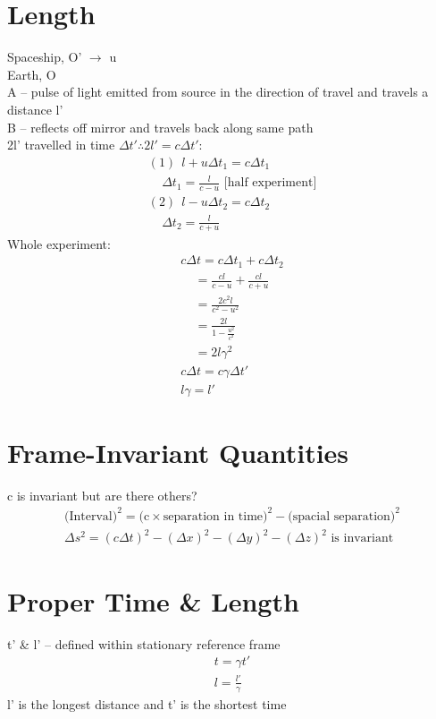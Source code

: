 \documentclass[a4paper, 11pt, fleqn, normalem]{report}
\begin{document}
\section{Length}
Spaceship, O' $\rightarrow$ u \\
Earth, O \\
A -- pulse of light emitted from source in the direction of travel and travels a distance l' \\
B -- reflects off mirror and travels back along same path \\
2l' travelled in time $\Delta t' \therefore 2l' = c\Delta t'$:
\begin{gather*}
    (1)~~l + u\Delta t_{1} = c\Delta t_{1} \\
    ~~~~~\Delta t_{1} = \frac{l}{c - u} \text{ [half experiment]} \\
    (2)~~l - u\Delta t_{2} = c\Delta t_{2} \\
    ~~~~~\Delta t_{2} = \frac{l}{c + u}
\end{gather*}
Whole experiment:
\begin{gather*}
    c\Delta t = c\Delta t_{1} + c\Delta t_{2} \\
    ~~~~~ = \frac{cl}{c - u} + \frac{cl}{c + u} \\
    ~~~~~ = \frac{2c^{2}l}{c^{2} - u^{2}} \\
    ~~~~~ = \frac{2l}{1 - \tfrac{u^{2}}{c^{2}}} \\
    ~~~~~ = 2l\gamma^{2} \\
    c\Delta t = c\gamma\Delta t' \\
    l\gamma = l'
\end{gather*}

\section{Frame-Invariant Quantities}
c is invariant but are there others?
\begin{gather*}
    \text{(Interval)}^{2} = \text{(c}\times\text{separation in time)}^{2} - \text{(spacial separation)}^{2} \\
    \Delta s^{2} = (c\Delta t)^{2} - (\Delta x)^{2} - (\Delta y)^{2} - (\Delta z)^{2}\text{ is invariant}
\end{gather*}

\section{Proper Time \& Length}
t' \& l' -- defined within stationary reference frame
\begin{gather*}
    t = \gamma t' \\
    l = \frac{l'}{\gamma}
\end{gather*}
l' is the longest distance and t' is the shortest time
\end{document}
